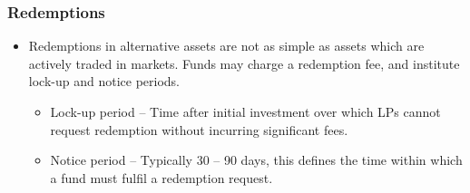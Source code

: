 \documentclass[../notes_compiled.tex]{subfiles}
\begin{document}
\subsubsection{Redemptions}
\begin{itemize}
\item Redemptions in alternative assets are not as simple as assets which are actively traded in markets. Funds may charge a redemption fee, and institute lock-up and notice periods.
\begin{itemize}
\item Lock-up period -- Time after initial investment over which LPs cannot request redemption without incurring significant fees.
\item Notice period -- Typically 30 -- 90 days, this defines the time within which a fund must fulfil a redemption request.
\end{itemize}
\end{itemize}
\end{document}
